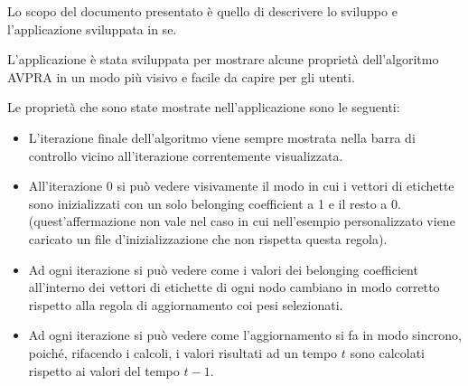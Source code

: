 \documentclass[a4paper,12pt]{report}
\begin{document}
Lo scopo del documento presentato è quello di descrivere lo sviluppo e l'applicazione sviluppata in se.

L'applicazione è stata sviluppata per mostrare alcune proprietà dell'algoritmo AVPRA in un modo più visivo e facile da capire per gli utenti.

Le proprietà che sono state mostrate nell'applicazione sono le seguenti:
\begin{itemize}
\item L'iterazione finale dell'algoritmo viene sempre mostrata nella barra di controllo vicino all'iterazione correntemente visualizzata.

\item All'iterazione 0 si può vedere visivamente il modo in cui i vettori di etichette sono inizializzati con un solo belonging coefficient a 1 e il resto a 0. (quest'affermazione non vale nel caso in cui nell'esempio personalizzato viene caricato un file d'inizializzazione che non rispetta questa regola).

\item Ad ogni iterazione si può vedere come i valori dei belonging coefficient all'interno dei vettori di etichette di ogni nodo cambiano in modo corretto rispetto alla regola di aggiornamento coi pesi selezionati.

\item Ad ogni iterazione si può vedere come l'aggiornamento si fa in modo sincrono, poiché, rifacendo i calcoli, i valori risultati ad un tempo $t$ sono calcolati rispetto ai valori del tempo $t-1$.
\end{itemize}
\end{document}
